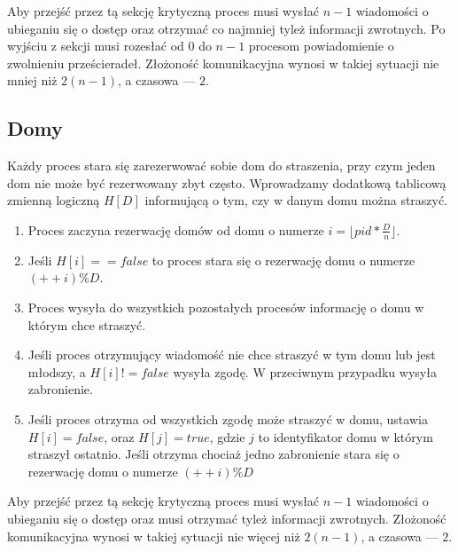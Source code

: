 \documentclass{article}
\begin{document}
Aby przejść przez tą sekcję krytyczną proces musi wysłać $n-1$ wiadomości o ubieganiu się o dostęp 
oraz otrzymać co najmniej tyleż informacji zwrotnych.
Po wyjściu z sekcji musi rozesłać od $0$ do $n-1$ procesom powiadomienie o zwolnieniu prześcieradeł.
Złożoność komunikacyjna wynosi w takiej sytuacji nie mniej niż $2(n-1)$, a czasowa --- $2$.

\subsection{Domy}
Każdy proces stara się zarezerwować sobie dom do straszenia, przy czym jeden dom nie może być rezerwowany zbyt często. Wprowadzamy dodatkową tablicową zmienną logiczną $H[D]$ informującą o tym, czy w danym domu można straszyć.
\begin{enumerate}
    \item Proces zaczyna rezerwację domów od domu o numerze $ i = \lfloor pid * \frac{D}{n} \rfloor$.
    \item Jeśli $H[i] == false$ to proces stara się o rezerwację domu o numerze $(++i) \% D$.
    \item Proces wysyła do wszystkich pozostałych procesów informację o domu w którym chce straszyć.
    \item Jeśli proces otrzymujący wiadomość nie chce straszyć w tym domu lub jest młodszy, a $H[i] != false$  wysyła zgodę. W przeciwnym przypadku wysyła zabronienie.
    \item Jeśli proces otrzyma od wszystkich zgodę może straszyć w domu, ustawia $H[i] = false$, oraz $H[j] = true$, gdzie $j$ to identyfikator domu w którym straszył ostatnio. Jeśli otrzyma chociaż jedno zabronienie stara się o rezerwację domu o numerze $(++i) \% D$
\end{enumerate}

Aby przejść przez tą sekcję krytyczną proces musi wysłać $n-1$ wiadomości o ubieganiu się o dostęp 
oraz musi otrzymać tyleż informacji zwrotnych.
Złożoność komunikacyjna wynosi w takiej sytuacji nie więcej niż $2(n-1)$, a czasowa --- $2$.






\end{document}
